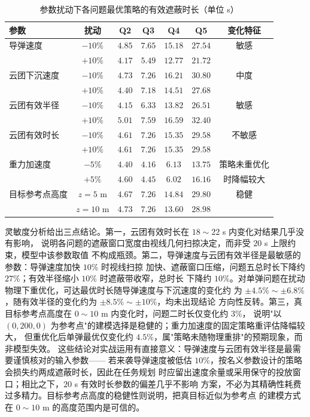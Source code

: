 \documentclass[12pt, a4paper]{article}
\begin{document}
\begin{table}[H]
\centering
\caption{参数扰动下各问题最优策略的有效遮蔽时长（单位 s）}
\label{tab:sensitivity}
\begin{tabular}{lcccccc}
\toprule
\textbf{参数} & \textbf{扰动} & Q2 & Q3 & Q4 & Q5 & 变化特征 \\
\midrule
导弹速度 & $-10\%$ & $4.85$ & $7.65$ & $15.18$ & $27.54$ & 敏感 \\
         & $+10\%$ & $4.17$ & $5.49$ & $12.77$ & $21.72$ & \\
云团下沉速度 & $-10\%$ & $4.73$ & $7.26$ & $16.21$ & $30.80$ & 中度 \\
             & $+10\%$ & $4.40$ & $7.18$ & $14.51$ & $27.68$ & \\
云团有效半径 & $-10\%$ & $4.15$ & $6.33$ & $13.82$ & $26.51$ & 敏感 \\
             & $+10\%$ & $5.01$ & $7.59$ & $16.59$ & $32.40$ & \\
云团有效时长 & $-10\%$ & $4.61$ & $7.26$ & $15.35$ & $29.58$ & 不敏感 \\
             & $+10\%$ & $4.61$ & $7.26$ & $15.35$ & $29.58$ & \\
重力加速度 & $-5\%$ & $4.40$ & $4.16$ & $6.13$ & $13.75$ & 策略未重优化 \\
            & $+5\%$ & $4.60$ & $4.45$ & $6.02$ & $16.16$ & 时降幅较大 \\
目标参考点高度 & $z=5$ m & $4.67$ & $7.26$ & $14.84$ & $29.80$ & 稳健 \\
              & $z=10$ m & $4.73$ & $7.26$ & $13.60$ & $28.98$ & \\
\bottomrule
\end{tabular}
\end{table}

灵敏度分析给出三点结论。第一，云团有效时长在 $18\sim22$ s 内变化对结果几乎没有影响，
说明各问题的遮蔽窗口宽度由视线几何扫掠决定，而非受 $20$ s 上限约束，模型中该参数取值
不构成瓶颈。第二，导弹速度与云团有效半径是最敏感的参数：导弹速度加快 $10\%$ 时视线扫掠
加快、遮蔽窗口压缩，问题五总时长下降约 $27\%$；有效半径缩小 $10\%$ 时遮蔽带收窄，总时长
下降约 $10\%$。对单弹问题在扰动物理下重优化，可达最优时长随导弹速度与下沉速度的变化约
为 $\pm4.5\%\sim\pm6.8\%$，随有效半径的变化约为 $\pm8.5\%\sim\pm10\%$，均未出现结论
方向性反转。第三，真目标参考点高度在 $0\sim10$ m 内变化时，问题二时长仅变化约 $3\%$，
说明"以 $(0,200,0)$ 为参考点"的建模选择是稳健的；重力加速度的固定策略重评估降幅较大，
但重优化后单弹最优仅变化约 $4.5\%$，属"策略未随物理重排"的预期现象，而非模型失效。
这些结论对实战运用有直接意义：导弹速度与云团有效半径是最需要谨慎核对的输入参数——
若来袭导弹速度被低估 $10\%$，按名义参数设计的策略会损失约两成遮蔽时长，因此在任务规划
时应留出速度余量或采用保守的投放窗口；相比之下，$20$ s 有效时长参数的偏差几乎不影响
方案，不必为其精确性耗费过多精力。目标参考点高度的稳健性则说明，把真目标近似为参考点
的建模方式在 $0\sim10$ m 的高度范围内是可信的。
\end{document}
